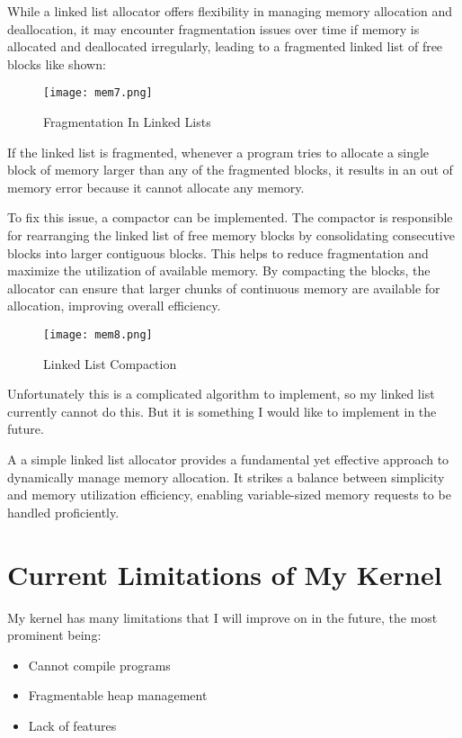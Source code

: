 \documentclass[12pt, letterpaper]{article}
\begin{document}
While a linked list allocator offers flexibility in managing memory allocation and deallocation, it may encounter 
fragmentation issues over time if memory is allocated and deallocated irregularly, leading to a fragmented linked 
list of free blocks like shown:

\begin{figure}[H]
      \centering
      \texttt{[image: mem7.png]}
      \caption{Fragmentation In Linked Lists}
      \label{fig:mem7}
\end{figure}

If the linked list is fragmented, whenever a program tries to allocate a single block of memory larger than any of 
the fragmented blocks, it results in an out of memory error because it cannot allocate any memory.

To fix this issue, a compactor can be implemented. The compactor is responsible for rearranging the linked list of 
free memory blocks by consolidating consecutive blocks into larger contiguous blocks. This helps to reduce 
fragmentation and maximize the utilization of available memory. By compacting the blocks, the allocator can ensure 
that larger chunks of continuous memory are available for allocation, improving overall efficiency.

\begin{figure}[H]
      \centering
      \texttt{[image: mem8.png]}
      \caption{Linked List Compaction}
      \label{fig:mem8}
\end{figure}

Unfortunately this is a complicated algorithm to implement, so my linked list currently cannot do this. But it is 
something I would like to implement in the future.

A a simple linked list allocator provides a fundamental yet effective approach to dynamically manage memory 
allocation. It strikes a balance between simplicity and memory utilization efficiency, enabling variable-sized 
memory requests to be handled proficiently.


\section{Current Limitations of My Kernel}

My kernel has many limitations that I will improve on in the future, the most prominent being:
\begin{itemize}
\item Cannot compile programs
\item Fragmentable heap management
\item Lack of features
\end{itemize}
\end{document}
